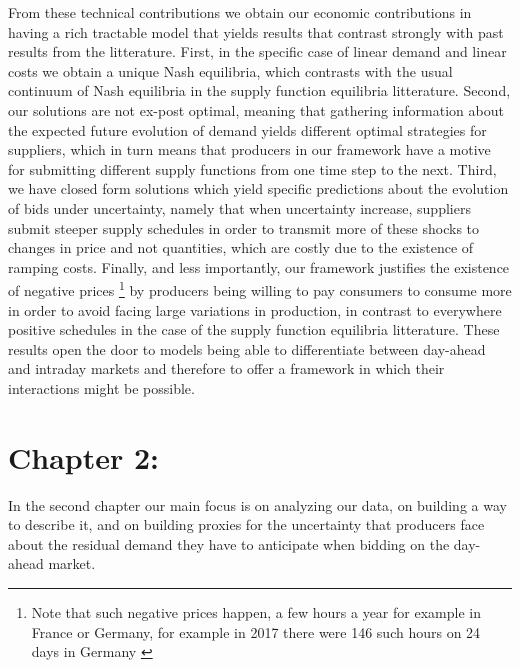 From these technical contributions we obtain our economic contributions in having a rich tractable model that yields results that contrast strongly with past results from the litterature. First, in the specific case of linear demand and linear costs we obtain a unique Nash equilibria, which contrasts with the usual continuum of Nash equilibria in the supply function equilibria litterature. Second, our solutions are not ex-post optimal, meaning that gathering information about the expected future evolution of demand yields different optimal strategies for suppliers, which in turn means that producers in our framework have a motive for submitting different supply functions from one time step to the next. Third, we have closed form solutions which yield specific predictions about the evolution of bids under uncertainty, namely that when uncertainty increase, suppliers submit steeper supply schedules in order to transmit more of these shocks to changes in price and not quantities, which are costly due to the existence of ramping costs. Finally, and less importantly, our framework justifies the existence of negative prices \footnote{Note that such negative prices happen, a few hours a year for example in France or Germany, for example in 2017 there were 146 such hours on 24 days in Germany \cite{epexnegP}} by producers being willing to pay consumers to consume more in order to avoid facing large variations in production, in contrast to everywhere positive schedules in the case of the supply function equilibria litterature. These results open the door to models being able to differentiate between day-ahead and intraday markets and therefore to offer a framework in which their interactions might be possible.\\

\section*{Chapter 2: }

In the second chapter our main focus is on analyzing our data, on building a way to describe it, and on building proxies for the uncertainty that producers face about the residual demand they have to anticipate when bidding on the day-ahead market. \\

